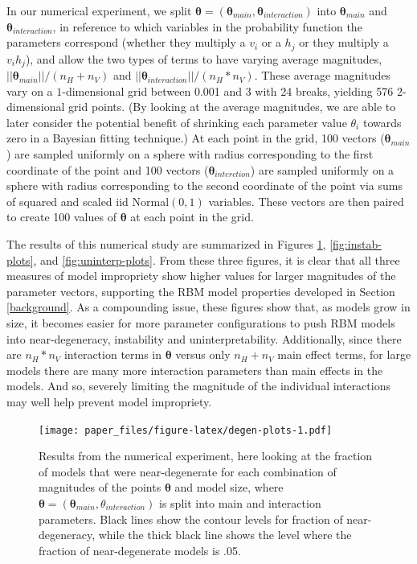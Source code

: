 \documentclass[AMS,STIX1COL]{WileyNJD-v2}
\newcommand{\nv}{{n_{\scriptscriptstyle V}}}
\newcommand{\nh}{{n_{\scriptscriptstyle H}}}
\begin{document}
In our numerical experiment, we split
\(\boldsymbol \theta = (\boldsymbol \theta_{main}, \boldsymbol \theta_{interaction})\)
into \(\boldsymbol \theta_{main}\) and
\(\boldsymbol \theta_{interaction}\), in reference to which variables in
the probability function the parameters correspond (whether they
multiply a \(v_i\) or a \(h_j\) or they multiply a \(v_i h_j\)), and
allow the two types of terms to have varying average magnitudes,
\(||\boldsymbol \theta_{main} || /(\nh+\nv)\) and
\(||\boldsymbol \theta_{interaction} || /(\nh*\nv)\). These average
magnitudes vary on a \(1\)-dimensional grid between 0.001 and 3 with 24
breaks, yielding 576 \(2\)-dimensional grid points. (By looking at the
average magnitudes, we are able to later consider the potential benefit
of shrinking each parameter value \(\theta_i\) towards zero in a
Bayesian fitting technique.) At each point in the grid, 100 vectors
(\(\boldsymbol \theta_{main}\)) are sampled uniformly on a sphere with
radius corresponding to the first coordinate of the point and 100
vectors (\(\boldsymbol \theta_{interction}\)) are sampled uniformly on a
sphere with radius corresponding to the second coordinate of the point
via sums of squared and scaled iid Normal\((0, 1)\) variables. These
vectors are then paired to create 100 values of \(\boldsymbol \theta\)
at each point in the grid.

The results of this numerical study are summarized in Figures
\ref{fig:degen-plots}, \ref{fig:instab-plots}, and
\ref{fig:uninterp-plots}. From these three figures, it is clear that all
three measures of model impropriety show higher values for larger
magnitudes of the parameter vectors, supporting the RBM model properties
developed in Section \ref{background}. As a compounding issue, these
figures show that, as models grow in size, it becomes easier for more
parameter configurations to push RBM models into near-degeneracy,
instability and uninterpretability. Additionally, since there are
\(\nh*\nv\) interaction terms in \(\boldsymbol \theta\) versus only
\(\nh + \nv\) main effect terms, for large models there are many more
interaction parameters than main effects in the models. And so, severely
limiting the magnitude of the individual interactions may well help
prevent model impropriety.

\par

\begin{figure}
\centering
\texttt{[image: paper\_files/figure-latex/degen-plots-1.pdf]}
\caption{\label{fig:degen-plots}Results from the numerical experiment,
here looking at the fraction of models that were near-degenerate for
each combination of magnitudes of the points \(\boldsymbol \theta\) and
model size, where
\(\boldsymbol \theta = (\boldsymbol \theta_{main}, \theta_{interaction})\)
is split into main and interaction parameters. Black lines show the
contour levels for fraction of near-degeneracy, while the thick black
line shows the level where the fraction of near-degenerate models is
.05.}
\end{figure}
\end{document}
